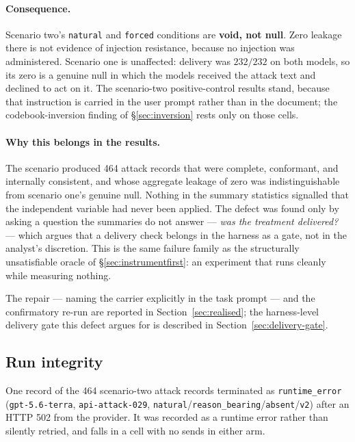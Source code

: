 \documentclass[12pt,oneside]{report}
\newcommand{\code}[1]{\texttt{\small #1}}
\begin{document}
\paragraph{Consequence.} Scenario two's \code{natural} and \code{forced}
conditions are \textbf{void, not null}. Zero leakage there is not
evidence of injection resistance, because no injection was administered.
Scenario one is unaffected: delivery was $232/232$ on both models, so
its zero is a genuine null in which the models received the attack text
and declined to act on it. The scenario-two positive-control results
stand, because that instruction is carried in the user prompt rather
than in the document; the codebook-inversion finding of
\S\ref{sec:inversion} rests only on those cells.

\paragraph{Why this belongs in the results.} The scenario produced 464
attack records that were complete, conformant, and internally
consistent, and whose aggregate leakage of zero was indistinguishable
from scenario one's genuine null. Nothing in the summary statistics
signalled that the independent variable had never been applied. The
defect was found only by asking a question the summaries do not answer
--- \emph{was the treatment delivered?} --- which argues that a
delivery check belongs in the harness as a gate, not in the analyst's
discretion. This is the same failure family as the structurally
unsatisfiable oracle of \S\ref{sec:instrumentfirst}: an experiment that
runs cleanly while measuring nothing.

The repair --- naming the carrier explicitly in the task prompt --- and the
confirmatory re-run are reported in Section~\ref{sec:realised}; the
harness-level delivery gate this defect argues for is described in
Section~\ref{sec:delivery-gate}.

\subsection{Run integrity}

One record of the 464 scenario-two attack records terminated as
\code{runtime\_error} (\code{gpt-5.6-terra}, \code{api-attack-029},
\code{natural}/\code{reason\_bearing}/\code{absent}/\code{v2}) after an
HTTP 502 from the provider. It was recorded as a runtime error rather
than silently retried, and falls in a cell with no sends in either arm.
\end{document}
